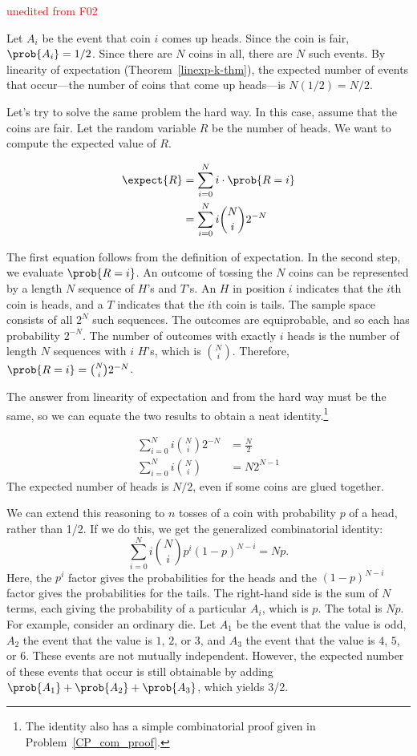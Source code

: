 \begin{editingnotes}
\textcolor{red}{unedited from F02}

Let $A_i$ be the event that coin $i$ comes up heads.  Since the coin
is fair, $\prob{A_i} = 1/2$.  Since there are $N$ coins in all, there
are $N$ such events.  By linearity of expectation
(Theorem~\ref{linexp-k-thm}), the expected number of events that
occur---the number of coins that come up heads---is $N(1/2) = N/2$.

Let's try to solve the same problem the hard way.  In this case,
assume that the coins are fair.  Let the random variable $R$ be the
number of heads.  We want to compute the expected value of $R$.

\begin{align*}
\expect{R}  & = \sum_{i=0}^N i \cdot \prob{R = i} \\
            & = \sum_{i=0}^N i \binom{N}{i} 2^{-N}
\end{align*}

The first equation follows from the definition of expectation.  In the
second step, we evaluate $\prob{R = i}$.  An outcome of tossing the $N$
coins can be represented by a length $N$ sequence of $H$'s and $T$'s.
An $H$ in position $i$ indicates that the $i$th coin is heads, and a
$T$ indicates that the $i$th coin is tails.  The sample space
consists of all $2^N$ such sequences.  The outcomes are equiprobable,
and so each has probability $2^{-N}$.  The number of outcomes with
exactly $i$ heads is the number of length $N$ sequences with $i$
$H$'s, which is $\binom{N}{i}$.  Therefore, $\prob{R = i} = \binom{N}{i}
2^{-N}$.

The answer from linearity of expectation and from the hard way must be
the same, so we can equate the two results to obtain a neat
identity.\footnote{The identity also has a simple combinatorial proof
  given in Problem~\ref{CP_com_proof}.}

\begin{align*}
\sum_{i=0}^N i \binom{N}{i} 2^{-N}  & = \frac{N}{2} \\
\sum_{i=0}^N i \binom{N}{i}         & = N2^{N-1}
\end{align*}
The expected number of heads is $N/2$, even if some coins are glued
together.

We can extend this reasoning to $n$ tosses of a coin with probability $p$
of a head, rather than 1/2.  If we do this, we get the generalized
combinatorial identity:
\begin{equation*}
    \sum_{i=0}^N i \binom{N}{i} p^i (1-p)^{N-i} = N p.
\end{equation*}
Here, the $p^i$ factor gives the probabilities for the heads and the
$(1-p)^{N-i}$ factor gives the probabilities for the tails.  The
right-hand side is the sum of $N$ terms, each giving the probability
of a particular $A_i$, which is $p$.  The total is $N p$.  For
example, consider an ordinary die.  Let $A_1$ be the event that the
value is odd, $A_2$ the event that the value is $1$, $2$, or $3$, and
$A_3$ the event that the value is $4$, $5$, or $6$.  These events are
not mutually independent.  However, the expected number of these
events that occur is still obtainable by adding $\prob{A_1} + \prob{A_2} +
\prob{A_3}$, which yields 3/2.


\end{editingnotes}
